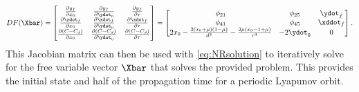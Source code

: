 \begin{equation}
    DF(\Xbar)=\begin{bmatrix}   \frac{\partial y_{f}}{\partial x_{0}}                                       &   \frac{\partial y_{f}}{\partial\ydot_{0}}    &   \frac{\partial y_{f}}{\partial\tau}     \\
                                \frac{\partial\xdot_{f}}{\partial x_{0}}                                    &   \frac{\partial\xdot_{f}}{\partial\ydot_{0}} &   \frac{\partial\xdot_{f}}{\partial\tau}  \\
                                \frac{\partial(C-C_{d})}{\partial x_{0}}                                    &   \frac{\partial(C-C_{d})}{\partial\ydot_{0}} &   \frac{\partial(C-C_{d})}{\partial\tau}  \end{bmatrix}
             =\begin{bmatrix}   \phi_{21}                                                                   &   \phi_{25}                                   &   \ydot_{f}                               \\
                                \phi_{41}                                                                   &   \phi_{45}                                   &   \xddot_{f}                              \\
                                2x_{0}-\frac{2(x_{0}+\mu)(1-\mu)}{d^{3}}-\frac{2\mu(x_{0}-1+\mu)}{r^{3}}    &   -2\ydot_{0}                                 &   0                                       \end{bmatrix}.
    \label{eq:Lyapunovjacobian}
\end{equation}
This Jacobian matrix can then be used with \cref{eq:NRsolution} to iteratively solve for the free
variable vector $\Xbar$ that solves the provided problem. This provides the initial state and half
of the propagation time for a periodic Lyapunov orbit.

